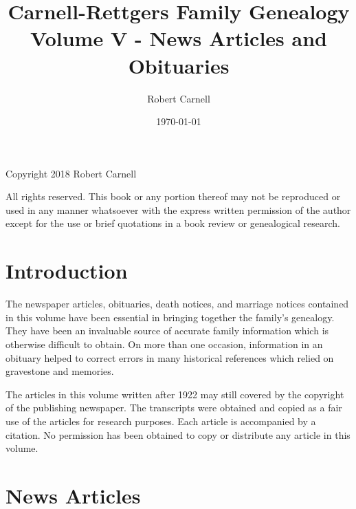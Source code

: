 \documentclass[11pt,letter]{book}
\title{\bf Carnell-Rettgers Family Genealogy \\
       \large Volume V - News Articles and Obituaries}
\author{Robert Carnell}
\date{\today}
\begin{document}
\frontmatter
\maketitle
\clearpage

\begingroup
\parindent 0pt
\parskip
\baselineskip
Copyright \textcopyright{} 2018 Robert Carnell

All rights reserved.  This book or any portion thereof may not be reproduced or used in any manner whatsoever with the express written permission of the author except for the use or brief quotations in a book review or genealogical research.
\endgroup
\clearpage

\tableofcontents
\mainmatter

\chapter{Introduction}

The newspaper articles, obituaries, death notices, and marriage notices contained in this volume have been essential in bringing together the family's genealogy.  They have been an invaluable source of accurate family information which is otherwise difficult to obtain.  On more than one occasion, information in an obituary helped to correct errors in many historical references which relied on gravestone and memories.

The articles in this volume written after 1922 may still covered by the copyright of the publishing newspaper.  The transcripts were obtained and copied as a fair use of the articles for research purposes.  Each article is accompanied by a citation.  No permission has been obtained to copy or distribute any article in this volume.

\chapter{News Articles}
\renewcommand{\thesection}{\arabic{section}}


\end{document}
